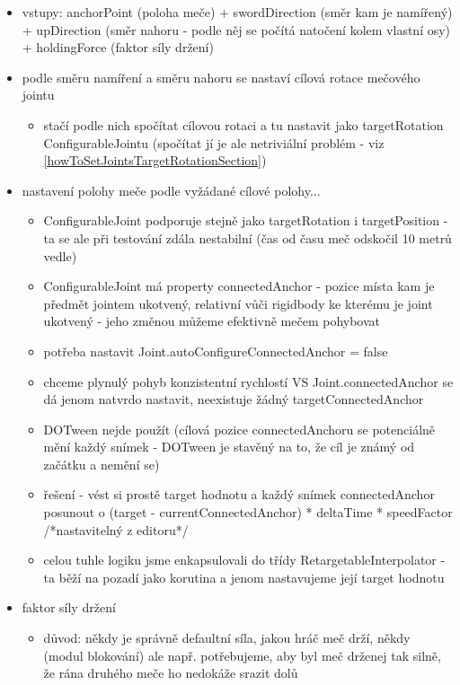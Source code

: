 \begin{itemize}
  \begin{itemize}
    \item vstupy: anchorPoint (poloha meče) + swordDirection (směr kam je namířený) + upDirection (směr nahoru - podle něj se počítá natočení kolem vlastní osy) + holdingForce (faktor síly držení)
    \item podle směru namíření a směru nahoru se nastaví cílová rotace mečového jointu
      \begin{itemize}
        \item stačí podle nich spočítat cílovou rotaci a tu nastavit jako targetRotation ConfigurableJointu (spočítat jí je ale netriviální problém - viz \ref{howToSetJointsTargetRotationSection})
      \end{itemize}
    \item nastavení polohy meče podle vyžádané cílové polohy...
      \begin{itemize}
        \item ConfigurableJoint podporuje stejně jako targetRotation i targetPosition - ta se ale při testování zdála nestabilní (čas od času meč odskočil 10 metrů vedle)
        \item ConfigurableJoint má property connectedAnchor - pozice místa kam je předmět jointem ukotvený, relativní vůči rigidbody ke kterému je joint ukotvený - jeho změnou můžeme efektivně mečem pohybovat
        \item potřeba nastavit Joint.autoConfigureConnectedAnchor = false
        \item chceme plynulý pohyb konzistentní rychlostí VS Joint.connectedAnchor se dá jenom natvrdo nastavit, neexistuje žádný targetConnectedAnchor 
        \item DOTween nejde použít (cílová pozice connectedAnchoru se potenciálně mění každý snímek - DOTween je stavěný na to, že cíl je známý od začátku a nemění se)
        \item řešení - vést si prostě target hodnotu a každý snímek connectedAnchor posunout o (target - currentConnectedAnchor) * deltaTime * speedFactor /*nastavitelný z editoru*/
        \item celou tuhle logiku jsme enkapsulovali do třídy RetargetableInterpolator - ta běží na pozadí jako korutina a jenom nastavujeme její target hodnotu
      \end{itemize}
    \item faktor síly držení
      \begin{itemize}
        \item důvod: někdy je správně defaultní síla, jakou hráč meč drží, někdy (modul blokování) ale např. potřebujeme, aby byl meč drženej tak silně, že rána druhého meče ho nedokáže srazit dolů

\end{itemize}
\end{itemize}
\end{itemize}
